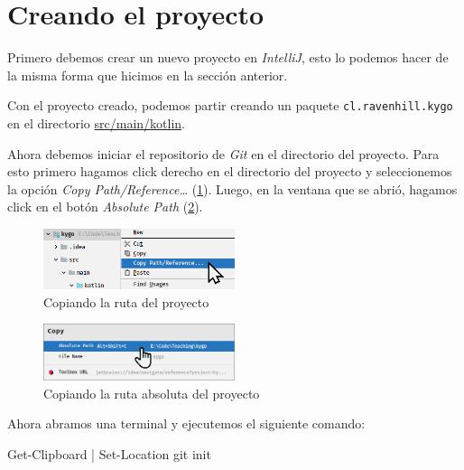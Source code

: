 \section{Creando el proyecto}
  Primero debemos crear un nuevo proyecto en \textit{IntelliJ}, esto lo podemos hacer de la misma
  forma que hicimos en la sección anterior.

  Con el proyecto creado, podemos partir creando un paquete \texttt{cl.ravenhill.kygo} en el 
  directorio \url{src/main/kotlin}.

  Ahora debemos iniciar el repositorio de \textit{Git} en el directorio del proyecto.
  Para esto primero hagamos click derecho en el directorio del proyecto y seleccionemos la opción
  \textit{Copy Path/Reference\dots} (\cref{fig:copy-path}).
  Luego, en la ventana que se abrió, hagamos click en el botón \textit{Absolute Path} 
  (\cref{fig:abs-path}).

  \begin{figure}[H]
    \centering
    \includegraphics[width=0.5\textwidth]{img/oop/principios/vcs/copy-path.png}
    \caption{Copiando la ruta del proyecto}
    \label{fig:copy-path}
  \end{figure}

  \begin{figure}[H]
    \centering
    \includegraphics[width=0.5\textwidth]{img/oop/principios/vcs/abs-path.png}
    \caption{Copiando la ruta absoluta del proyecto}
    \label{fig:abs-path}
  \end{figure}

  Ahora abramos una terminal y ejecutemos el siguiente comando:

  \begin{defaultbox}[Windows]
    \begin{powershell}
      Get-Clipboard | Set-Location
      git init
    \end{powershell}
  \end{defaultbox}

  \begin{defaultbox}[Linux]
  \end{defaultbox}

